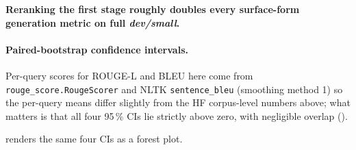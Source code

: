 \documentclass[11pt,a4paper]{article}
\newcommand{\devsmall}{\textit{dev/small}}
\newcommand{\fdev}{6\,980}
\newcommand{\rougel}{ROUGE-L}
\newcommand{\bmtwofive}{BM25}
\begin{document}
\begin{table}[H]
  \centering
  \caption{Headline paired generation comparison on the full
  \fdev{} shared qid set.  Same T5-small, same prompt, same top-3
  passage count; only the upstream retrieval source differs.}
  \label{tab:w3-headline}
  
\end{table}

\textbf{Reranking the first stage roughly doubles every
surface-form generation metric on full \devsmall{}.}

\paragraph{Paired-bootstrap confidence intervals.}  Per-query scores
for \rougel{} and BLEU here come from \texttt{rouge\_score.RougeScorer}
and NLTK \texttt{sentence\_bleu} (smoothing method 1) so the
per-query means differ slightly from the HF corpus-level numbers
above; what matters is that all four 95\,\% CIs lie strictly above
zero, with negligible overlap ().

\begin{table}[H]
  \centering
  \caption{Paired-bootstrap 95\,\% CI on $\Delta$ (rerank $-$
  \bmtwofive{}).  $n\!=\!\fdev$, 10\,000 resamples, seed 42, percentile
  interval.  Two-sided $p$ from the bootstrap is $<\!0.001$ in every
  case.}
  \label{tab:w3-ci}
  
\end{table}

 renders the same four CIs as a forest
plot.
\end{document}
